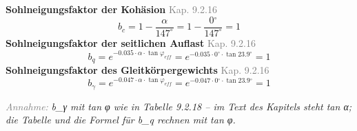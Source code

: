 \documentclass[11pt,a4paper]{article}
\newcommand{\normref}[1]{{\small\textcolor{gray}{#1}}}
\newcommand{\hinweis}[2]{\par\noindent\textcolor{gray}{\textit{#1:}} \textit{#2}\par}
\begin{document}
\noindent\textbf{Sohlneigungsfaktor der Kohäsion} \hfill \normref{Kap. 9.2.16}
\begin{equation*}
b_c = 1 - \frac{\alpha}{147^\circ} = 1 - \frac{0{}^{\circ}}{147^\circ} = 1
\end{equation*}
\noindent\textbf{Sohlneigungsfaktor der seitlichen Auflast} \hfill \normref{Kap. 9.2.16}
\begin{equation*}
b_q = e^{-0.035 \cdot \alpha \cdot \tan \varphi_{eff}} = e^{-0.035 \cdot 0{}^{\circ} \cdot \tan 23.9{}^{\circ}} = 1
\end{equation*}
\noindent\textbf{Sohlneigungsfaktor des Gleitkörpergewichts} \hfill \normref{Kap. 9.2.16}
\begin{equation*}
b_{\gamma} = e^{-0.047 \cdot \alpha \cdot \tan \varphi_{eff}} = e^{-0.047 \cdot 0{}^{\circ} \cdot \tan 23.9{}^{\circ}} = 1
\end{equation*}
\hinweis{Annahme}{b\_γ mit tan φ wie in Tabelle 9.2.18 -- im Text des Kapitels steht tan α; die Tabelle und die Formel für b\_q rechnen mit tan φ.}
\end{document}
